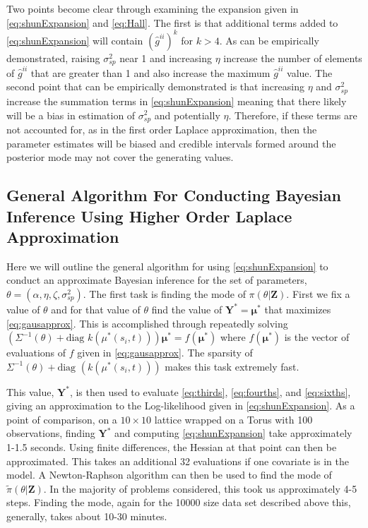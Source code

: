 \documentclass[11pt]{isuthesis}
\begin{document}
	Two points become clear through examining the expansion given in \eqref{eq:shunExpansion} and \eqref{eq:Hall}.  The first is that additional terms added to \eqref{eq:shunExpansion} will contain $(\hat{g}^{ii})^k$ for $k>4$.  As can be empirically demonstrated, raising $\sigma^2_{sp}$ near 1 and increasing $\eta$ increase the number of elements of $\hat{g}^{ii}$ that are greater than 1 and also increase the maximum $\hat{g}^{ii}$ value.  The second point that can be empirically demonstrated is that increasing $\eta$ and $\sigma_{sp}^2$ increase the summation terms in \eqref{eq:shunExpansion} meaning that there likely will be a bias in estimation of $\sigma_{sp}^2$ and potentially $\eta$.  Therefore, if these terms are not accounted for, as in the first order Laplace approximation, then the parameter estimates will be biased and credible intervals formed around the posterior mode may not cover the generating values.
	
	\subsection{General Algorithm For Conducting Bayesian Inference Using Higher Order Laplace Approximation}
	
	Here we will outline the general algorithm for using \eqref{eq:shunExpansion} to conduct an approximate Bayesian inference for the set of parameters, $\theta=\left(\alpha,\eta,\zeta,\sigma_{sp}^2\right)$.  The first task is finding the mode of $\pi(\theta|\boldsymbol{Z})$.  First we fix a value of $\theta$ and for that value of $\theta$ find the value of $\boldsymbol{Y}^*=\boldsymbol{\mu}^*$ that maximizes \eqref{eq:gausapprox}.  This is accomplished through repeatedly solving $\left(\Sigma^{-1}(\theta)+\text{diag }k(\mu^*(s_i,t))\right)\boldsymbol{\mu}^*=f(\boldsymbol{\mu}^*)$ where $f(\boldsymbol{\mu^*})$ is the vector of evaluations of $f$ given in \eqref{eq:gausapprox}.  The sparsity of $\Sigma^{-1}(\theta)+\text{diag }(k(\mu^*(s_i,t)))$ makes this task extremely fast.
	
	This value, $\boldsymbol{Y}^*$, is then used to evaluate \eqref{eq:thirds}, \eqref{eq:fourths}, and \eqref{eq:sixths}, giving an approximation to the Log-likelihood given in \eqref{eq:shunExpansion}.  As a point of comparison, on a $10 \times 10$ lattice wrapped on a Torus with 100 observations, finding $\boldsymbol{Y}^*$ and computing \eqref{eq:shunExpansion} take approximately 1-1.5 seconds.  Using finite differences, the Hessian at that point can then be approximated.  This takes an additional 32 evaluations if one covariate is in the model.  A Newton-Raphson algorithm can then be used to find the mode of $\tilde{\pi}(\theta|\boldsymbol{Z})$.  In the majority of problems considered, this took us approximately 4-5 steps.  Finding the mode, again for the 10000 size data set described above this, generally, takes about 10-30 minutes.
	
\end{document}
